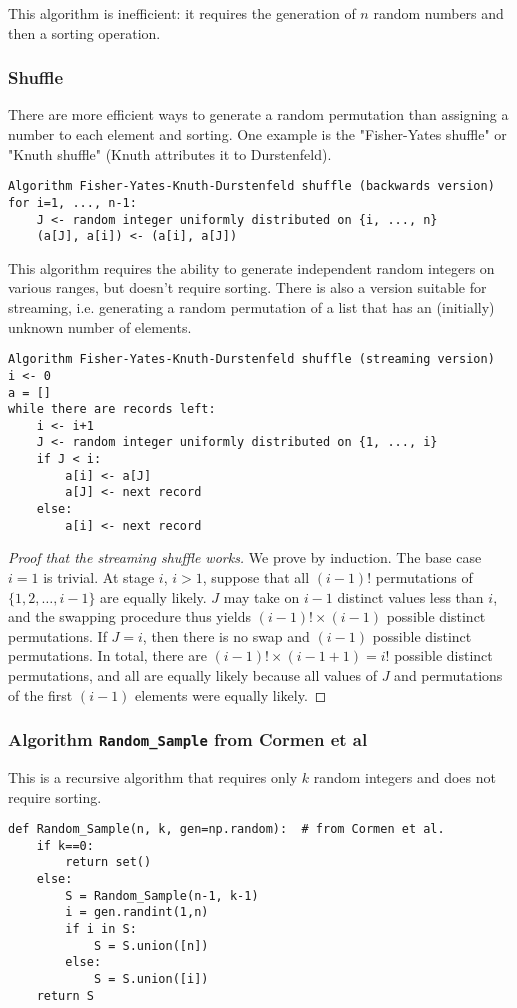 \documentclass[12pt]{article}
\newcommand{\todo}[1]{{\color{red}{TO DO: \sc #1}}}
\begin{document}
This algorithm is inefficient: it requires the generation of $n$ random numbers and then a sorting operation.

\subsubsection{Shuffle}
There are more efficient ways to generate a random permutation than assigning a number to each element and sorting.
One example is the "Fisher-Yates shuffle" or "Knuth shuffle" (Knuth attributes it to Durstenfeld).

\begin{verbatim}
Algorithm Fisher-Yates-Knuth-Durstenfeld shuffle (backwards version)
for i=1, ..., n-1:
    J <- random integer uniformly distributed on {i, ..., n}
    (a[J], a[i]) <- (a[i], a[J])
\end{verbatim}

This algorithm requires the ability to generate independent random integers on various ranges, but doesn't require sorting.
There is also a version suitable for streaming, i.e. generating a random permutation of a list that has an (initially) unknown number of elements.

\begin{verbatim}
Algorithm Fisher-Yates-Knuth-Durstenfeld shuffle (streaming version)
i <- 0
a = []
while there are records left:
    i <- i+1
    J <- random integer uniformly distributed on {1, ..., i}
    if J < i:
        a[i] <- a[J]
        a[J] <- next record
    else:
        a[i] <- next record

\end{verbatim}

\begin{proof}[Proof that the streaming shuffle works]
We prove by induction. The base case $i=1$ is trivial.
At stage $i$, $i>1$, suppose that all $(i-1)!$ permutations of $\{1, 2, \dots, i-1\}$ are equally likely.
$J$ may take on $i-1$ distinct values less than $i$, and the swapping procedure thus yields $(i-1)! \times (i-1)$
possible distinct permutations.
If $J = i$, then there is no swap and $(i-1)$ possible distinct permutations.
In total, there are $(i-1)! \times (i-1 + 1) = i!$ possible distinct permutations, and all are equally likely because
all values of $J$ and permutations of the first $(i-1)$ elements were equally likely.
\end{proof}


\subsubsection{Algorithm \texttt{Random\_Sample} from Cormen et al \todo{cite}}
This is a recursive algorithm that requires only $k$ random integers and does not require sorting.
\todo{turn into pseudocode; prove by recursion that the method works}
\begin{verbatim}
def Random_Sample(n, k, gen=np.random):  # from Cormen et al.
    if k==0:
        return set()
    else:
        S = Random_Sample(n-1, k-1)
        i = gen.randint(1,n) 
        if i in S:
            S = S.union([n])
        else:
            S = S.union([i])
    return S
\end{verbatim}
\end{document}
